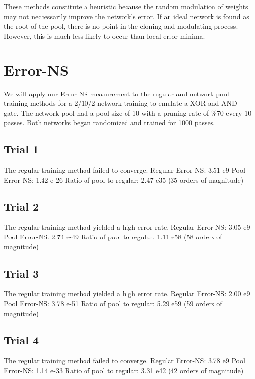 \documentclass[8pt]{amsart}
\begin{document}
These methods constitute a heuristic because the random modulation of weights
may not neccessarily improve the network's error. If an ideal network is found
as the root of the pool, there is no point in the cloning and modulating process.
However, this is much less likely to occur than local error minima.

\section{Error-NS}

We will apply our Error-NS measurement to the regular and network pool training
methods for a 2/10/2 network training to emulate a XOR and AND gate. The network
pool had a pool size of 10 with a pruning rate of \%70 every 10 passes. Both
networks began randomized and trained for 1000 passes.

\subsection{Trial 1}

The regular training method failed to converge.
Regular Error-NS: 3.51 e9
Pool Error-NS: 1.42 e-26
Ratio of pool to regular: 2.47 e35 (35 orders of magnitude)

\subsection{Trial 2}

The regular training method yielded a high error rate.
Regular Error-NS: 3.05 e9
Pool Error-NS: 2.74 e-49
Ratio of pool to regular: 1.11 e58 (58 orders of magnitude)

\subsection{Trial 3}

The regular training method yielded a high error rate.
Regular Error-NS: 2.00 e9
Pool Error-NS: 3.78 e-51
Ratio of pool to regular: 5.29 e59 (59 orders of magnitude)

\subsection{Trial 4}

The regular training method failed to converge.
Regular Error-NS: 3.78 e9
Pool Error-NS: 1.14 e-33
Ratio of pool to regular: 3.31 e42 (42 orders of magnitude)
\end{document}
